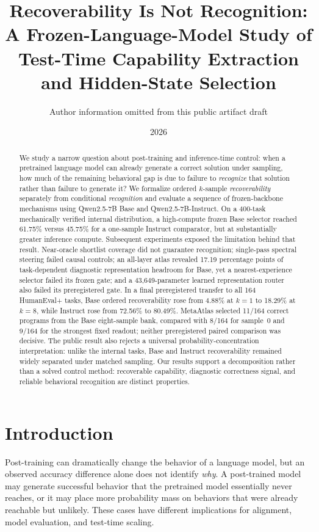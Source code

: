 \documentclass[11pt]{article}
\title{Recoverability Is Not Recognition:\\A Frozen-Language-Model Study of Test-Time Capability Extraction and Hidden-State Selection}
\author{Author information omitted from this public artifact draft}
\date{2026}
\begin{document}
\maketitle

\begin{abstract}
We study a narrow question about post-training and inference-time control: when a pretrained language model can already generate a correct solution under sampling, how much of the remaining behavioral gap is due to failure to \emph{recognize} that solution rather than failure to generate it? We formalize ordered $k$-sample \emph{recoverability} separately from conditional \emph{recognition} and evaluate a sequence of frozen-backbone mechanisms using Qwen2.5-7B Base and Qwen2.5-7B-Instruct. On a 400-task mechanically verified internal distribution, a high-compute frozen Base selector reached 61.75\% versus 45.75\% for a one-sample Instruct comparator, but at substantially greater inference compute. Subsequent experiments exposed the limitation behind that result. Near-oracle shortlist coverage did not guarantee recognition; single-pass spectral steering failed causal controls; an all-layer atlas revealed 17.19 percentage points of task-dependent diagnostic representation headroom for Base, yet a nearest-experience selector failed its frozen gate; and a 43,649-parameter learned representation router also failed its preregistered gate. In a final preregistered transfer to all 164 HumanEval+ tasks, Base ordered recoverability rose from 4.88\% at $k=1$ to 18.29\% at $k=8$, while Instruct rose from 72.56\% to 80.49\%. MetaAtlas selected 11/164 correct programs from the Base eight-sample bank, compared with 8/164 for sample~0 and 9/164 for the strongest fixed readout; neither preregistered paired comparison was decisive. The public result also rejects a universal probability-concentration interpretation: unlike the internal tasks, Base and Instruct recoverability remained widely separated under matched sampling. Our results support a decomposition rather than a solved control method: recoverable capability, diagnostic correctness signal, and reliable behavioral recognition are distinct properties.
\end{abstract}

\section{Introduction}

Post-training can dramatically change the behavior of a language model, but an observed accuracy difference alone does not identify \emph{why}. A post-trained model may generate successful behavior that the pretrained model essentially never reaches, or it may place more probability mass on behaviors that were already reachable but unlikely. These cases have different implications for alignment, model evaluation, and test-time scaling.
\end{document}
